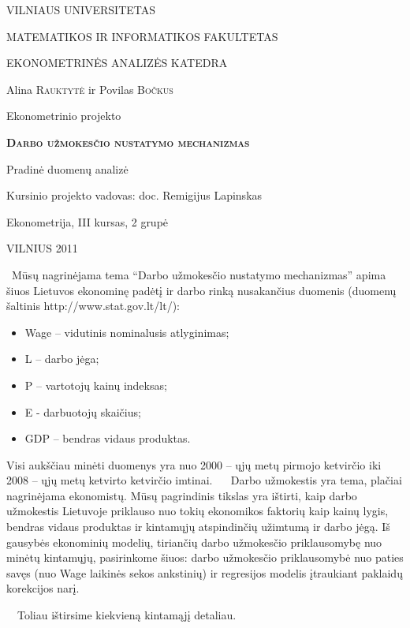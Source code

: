 \documentclass[12pt,a4paper]{article}
\theoremstyle{change}\newtheorem{salyga}{Uždavinys}
\begin{document}
\begin{titlepage}
\centerline{ \large VILNIAUS UNIVERSITETAS}
\bigskip
\centerline{\large MATEMATIKOS IR INFORMATIKOS FAKULTETAS}
\smallskip

\centerline{\large  EKONOMETRINĖS ANALIZĖS KATEDRA}
\vskip 200pt
\centerline{ \large Alina \textsc{Rauktytė} ir Povilas \textsc{Bočkus}}
\vskip 50pt
\centerline{\Large Ekonometrinio projekto}
\vskip 25pt
\centerline{\bf \Large \textsc{Darbo užmokesčio nustatymo mechanizmas}}
\vskip 25pt
\centerline{\Large Pradinė duomenų analizė}
\bigskip
\vskip 50pt
\begin{flushright}
 Kursinio projekto vadovas: 
 doc. Remigijus Lapinskas
\end{flushright}
\hfill Ekonometrija, III kursas, 2 grupė
\vskip 150pt
\centerline{\large VILNIUS 2011}
\end{titlepage}



\
Mūsų nagrinėjama tema “Darbo užmokesčio nustatymo mechanizmas” apima šiuos Lietuvos ekonominę padėtį ir 
darbo rinką nusakančius duomenis (duomenų šaltinis http://www.stat.gov.lt/lt/):

\medskip
\begin{itemize}

\item Wage – vidutinis nominalusis atlyginimas;
\item L – darbo jėga;
\item P – vartotojų kainų indeksas;
\item E -  darbuotojų skaičius;
\item GDP – bendras vidaus produktas.

\end{itemize}
Visi aukščiau minėti duomenys yra nuo 2000 – ųjų metų pirmojo ketvirčio iki 2008 – ųjų metų ketvirto ketvirčio imtinai.
\vskip 0pt
$\quad$ Darbo užmokestis yra tema, plačiai nagrinėjama ekonomistų. Mūsų pagrindinis tikslas yra ištirti, kaip darbo užmokestis Lietuvoje priklauso nuo tokių ekonomikos faktorių kaip kainų lygis, bendras vidaus produktas ir kintamųjų atspindinčių užimtumą ir darbo jėgą. Iš gausybės ekonominių modelių, tiriančių darbo užmokesčio priklausomybę nuo minėtų kintamųjų, pasirinkome šiuos: darbo užmokesčio priklausomybė nuo paties savęs (nuo Wage laikinės sekos ankstinių) ir regresijos modelis įtraukiant paklaidų korekcijos narį. 

\vskip 0pt
$\quad$Toliau ištirsime kiekvieną kintamąjį detaliau. 
\end{document}
